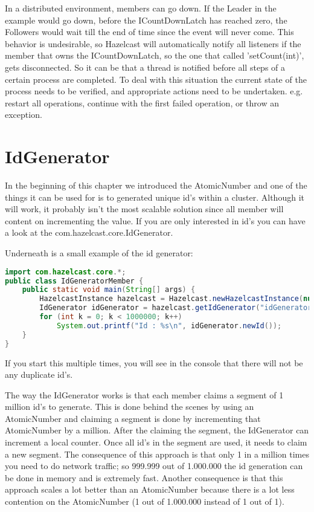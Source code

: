 In a distributed environment, members can go down. If the Leader in the example would go down, before the ICountDownLatch has reached zero, the Followers would wait till the end of time since the event will never come. This behavior is undesirable, so Hazelcast will automatically notify all listeners if the member that owns the ICountDownLatch, so the one that called 'setCount(int)', gets disconnected. So it can be that a thread is notified before all steps of a certain process are completed. To deal with this situation the current state of the process needs to be verified, and appropriate actions need to be undertaken. e.g. restart all operations, continue with the first failed operation, or throw an exception.

\section{IdGenerator}
In the beginning of this chapter we introduced the AtomicNumber and one of the things it can be used for is to generated unique id's within a cluster. Although it will work, it probably isn't the most scalable solution since all member will content on incrementing the value. If you are only interested in id's you can have a look at the com.hazelcast.core.IdGenerator.

Underneath is a small example of the id generator:
\begin{lstlisting}[language=java]
import com.hazelcast.core.*;
public class IdGeneratorMember {
    public static void main(String[] args) {
        HazelcastInstance hazelcast = Hazelcast.newHazelcastInstance(null);
        IdGenerator idGenerator = hazelcast.getIdGenerator("idGenerator");
        for (int k = 0; k < 1000000; k++)
            System.out.printf("Id : %s\n", idGenerator.newId());
    }
}
\end{lstlisting}
If you start this multiple times, you will see in the console that there will not be any duplicate id's.

The way the IdGenerator works is that each member claims a segment of 1 million id's to generate. This is done behind the scenes by using an AtomicNumber and claiming a segment is done by incrementing that AtomicNumber by a million. After the claiming the segment, the IdGenerator can increment a local counter. Once all id's in the segment are used, it needs to claim a new segment. The consequence of this approach is that only 1 in a million times you need to do network traffic; so 999.999 out of 1.000.000 the id generation can be done in memory and is extremely fast. Another consequence is that this approach scales a lot better than an AtomicNumber because there is a lot less contention on the AtomicNumber (1 out of 1.000.000 instead of 1 out of 1).

